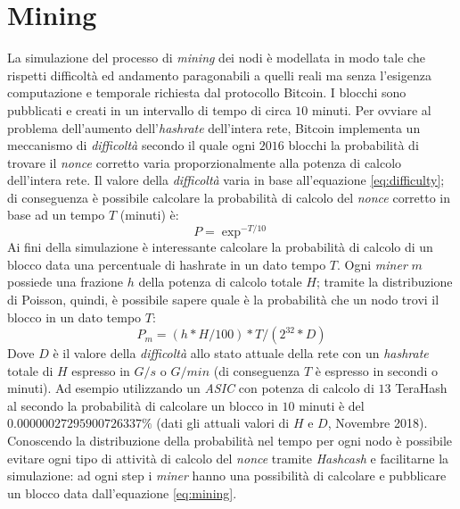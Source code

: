 \section{Mining}
La simulazione del processo di \textit{mining} dei nodi è modellata in modo tale che rispetti difficoltà ed andamento paragonabili a quelli reali ma senza l'esigenza computazione e temporale richiesta dal protocollo Bitcoin. I blocchi sono pubblicati e creati in un intervallo di tempo di circa $10$ minuti. Per ovviare al problema dell'aumento dell'\textit{hashrate} dell'intera rete, Bitcoin implementa un meccanismo di \textit{difficoltà} secondo il quale ogni $2016$ blocchi la probabilità di trovare il \textit{nonce} corretto varia proporzionalmente alla potenza di calcolo dell'intera rete.\newline
Il valore della \textit{difficoltà} varia in base all'equazione \ref{eq:difficulty}; di conseguenza è possibile calcolare la probabilità di calcolo del \textit{nonce} corretto in base ad un tempo $T$ (minuti) è:
\begin{equation}
    P = \exp^{-T/10}
\end{equation}
Ai fini della simulazione è interessante calcolare la probabilità di calcolo di un blocco data una percentuale di hashrate in un dato tempo $T$. Ogni \textit{miner} $m$ possiede una frazione $h$ della potenza di calcolo totale $H$; tramite la distribuzione di Poisson, quindi, è possibile sapere quale è la probabilità che un nodo trovi il blocco in un dato tempo $T$:
\begin{equation}\label{eq:mining}
    P_m = (h * H / 100) * T / (2^{32} * D)
\end{equation}
Dove $D$ è il valore della \textit{difficoltà} allo stato attuale della rete con un \textit{hashrate} totale di $H$ espresso in $G/s$ o $G/min$ (di conseguenza $T$ è espresso in secondi o minuti). Ad esempio utilizzando un \textit{ASIC} con potenza di calcolo di $13$ TeraHash al secondo la probabilità di calcolare un blocco in $10$ minuti è del $0.00000027295900726337\%$ (dati gli attuali valori di $H$ e $D$, Novembre 2018).\newline
Conoscendo la distribuzione della probabilità nel tempo per ogni nodo è possibile evitare ogni tipo di attività di calcolo del \textit{nonce} tramite \textit{Hashcash} e facilitarne la simulazione: ad ogni step i \textit{miner} hanno una possibilità di calcolare e pubblicare un blocco data dall'equazione \ref{eq:mining}.

